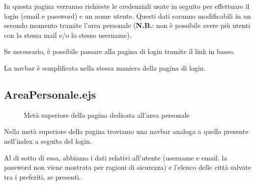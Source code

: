 In questa pagina verranno richieste le credenziali usate in seguito per effettuare il login (email e password) e un nome utente.
Questi dati saranno modificabili in un secondo momento tramite l'area personale (\textbf{N.B.}: non è possibile avere più utenti con
la stessa mail e/o lo stesso username).\\

\vspace{5mm}

Se necessario, è possibile passare alla pagina di login tramite il link in basso.\\

\vspace{5mm}

La navbar è semplificata nella stessa maniera della pagina di login.

\newpage
\subsection{AreaPersonale.ejs}

\begin{figure}[ht]
    \centering
    \caption{Metà superiore della pagina dedicata all'area personale}
\end{figure}

Nella metà superiore della pagina troviamo una navbar analoga a quella presente nell'index a seguito del login.

\vspace{5mm}

Al di sotto di essa, abbiamo i dati relativi all'utente (username e email. la password non viene mostrata per ragioni di
sicurezza) e l'elenco delle città salvate tra i preferiti, se presenti.


